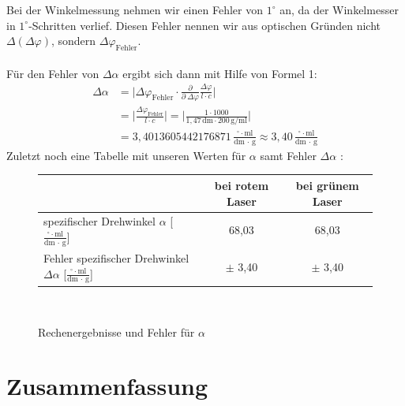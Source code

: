 \documentclass[fontsize=12pt]{scrartcl}
\begin{document}
Bei der Winkelmessung nehmen wir einen Fehler von $1^\circ$ an, da der Winkelmesser in $1^\circ$-Schritten verlief. Diesen Fehler nennen wir aus optischen Gründen nicht $\Delta (\Delta \varphi)$, sondern $\Delta\varphi_{\text{Fehler}}$.\\
~\\
Für den Fehler von $\Delta \alpha$ ergibt sich dann mit Hilfe von Formel 1:
\begin{align*}
\Delta \alpha &= \vert \Delta\varphi_{\text{Fehler}} \cdot \frac{\partial}{\partial~\Delta\varphi} \frac{\Delta\varphi}{l \cdot c} \vert \\
&= \vert  \frac{\Delta\varphi_{\text{Fehler}}}{l \cdot c} \vert = \vert \frac{ 1 \cdot 1000}{1,47\,\text{dm} \cdot 200\,\text{g/ml} }\vert  \\
&= 3,4013605442176871\,\frac{ ^\circ \cdot \text{ml}}{\text{dm $\cdot$ g}}  \approx 3,40\,\frac{ ^\circ \cdot \text{ml}}{\text{dm $\cdot$ g}}
\end{align*}
\noindent 
Zuletzt noch eine Tabelle mit unseren Werten für $\alpha$ samt Fehler $\Delta\alpha$ :
\begin{figure}[h]
\centering
\caption{Rechenergebnisse und Fehler für $\alpha$}
\begin{tabular}{|l|c|c|} \hline
  & bei rotem Laser  & bei grünem Laser\\ \hline
spezifischer Drehwinkel $\alpha$ [$\frac{ ^\circ \cdot \text{ml}}{\text{dm $\cdot$ g}}$]  & 68,03  & 68,03  \\ \hline
Fehler spezifischer Drehwinkel  $\Delta \alpha$ [$\frac{ ^\circ \cdot \text{ml}}{\text{dm $\cdot$ g}}$]  & $\pm$ 3,40  & $\pm$ 3,40  \\ \hline
\end{tabular} \\
\end{figure}
\newpage
\noindent

\section{Zusammenfassung}
\end{document}
